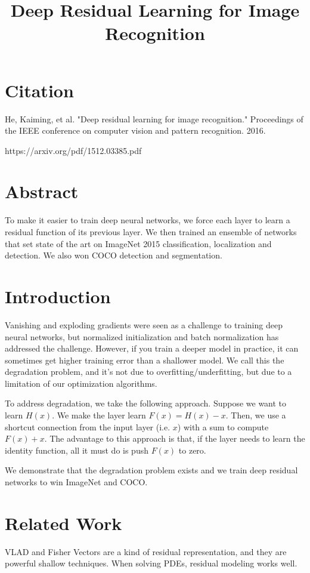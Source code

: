 \documentclass[a4paper]{article}
\title{Deep Residual Learning for Image Recognition}
\date{}
\begin{document}
\maketitle

\section{Citation}

He, Kaiming, et al. "Deep residual learning for image recognition." Proceedings of the IEEE conference on computer vision and pattern recognition. 2016.

https://arxiv.org/pdf/1512.03385.pdf

\section{Abstract}
To make it easier to train deep neural networks, we force each layer to learn
a residual function of its previous layer. We then trained an ensemble of
networks that set state of the art on ImageNet 2015 classification, localization
and detection. We also won COCO detection and segmentation.

\section{Introduction}
Vanishing and exploding gradients were seen as a challenge to training deep
neural networks, but normalized initialization and batch normalization has
addressed the challenge. However, if you train a deeper model in practice,
it can sometimes get higher training error than a shallower model. We call
this the degradation problem, and it's not due to overfitting/underfitting,
but due to a limitation of our optimization algorithms.

To address degradation, we take the following approach. Suppose we want to learn
$H(x)$. We make the layer learn $F(x) = H(x) - x$. Then, we use a shortcut
connection from the input layer (i.e. $x$) with a sum to compute $F(x) + x$.
The advantage to this approach is that, if the layer needs to learn the
identity function, all it must do is push $F(x)$ to zero.

We demonstrate that the degradation problem exists and we train deep residual
networks to win ImageNet and COCO.

\section{Related Work}
VLAD and Fisher Vectors are a kind of residual representation, and they are
powerful shallow techniques. When solving PDEs, residual modeling works well.
\end{document}
